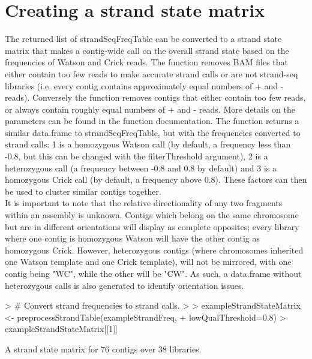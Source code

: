 \documentclass{article}
\begin{document}
\section{Creating a strand state matrix}

The returned list of strandSeqFreqTable can be converted to a strand state matrix that makes a contig-wide call on the overall strand state based on the frequencies of Watson and Crick reads. The function removes BAM files that either contain too few reads to make accurate strand calls or are not strand-seq libraries (i.e. every contig contains approximately equal numbers of + and - reads). Conversely the function removes contigs that either contain too few reads, or always contain roughly equal numbers of + and - reads.  More details on the parameters can be found in the function documentation.  The function returns a similar data.frame to strandSeqFreqTable, but with the frequencies converted to strand calls: 1 is a homozygous Watson call (by default, a frequency less than -0.8, but this can be changed with the filterThreshold argument), 2 is a heterozygous call (a frequency between -0.8 and 0.8 by default) and 3 is a homozygous Crick call (by default, a frequency above 0.8).  These factors can then be used to cluster similar contigs together.\\

It is important to note that the relative directionality of any two fragments within an assembly is unknown. Contigs which belong on the same chromosome but are in different orientations will display as complete opposites; every library where one contig is homozygous Watson will have the other contig as homozygous Crick.  However, heterozygous contigs (where chromosomes inherited one Watson template and one Crick template), will not be mirrored, with one contig being "WC", while the other will be "CW".  As such, a data.frame without heterozygous calls is also generated to identify orientation issues.  
 

\begin{Schunk}
\begin{Sinput}
> # Convert strand frequencies to strand calls.
> 
> exampleStrandStateMatrix <- preprocessStrandTable(exampleStrandFreq, 
+ lowQualThreshold=0.8)
> exampleStrandStateMatrix[[1]]
\end{Sinput}
\begin{Soutput}
A strand state matrix for  76  contigs over  38  libraries.
\end{Soutput}
\end{Schunk}
\end{document}
